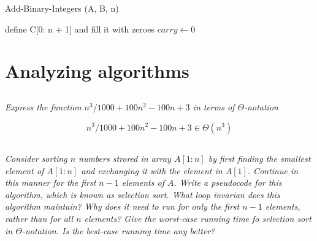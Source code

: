 \documentclass[11pt,oneside,titlepage]{book}
\begin{document}
\begin{function}
  \caption{Add-Binary-Integers (A, B, n)}
  define C[0: n + 1] and fill it with zeroes\;
  $carry \leftarrow 0$\;
  \;

\end{function}

\section{Analyzing algorithms}

\subsection{}

\textit{Express the function $n^3/1000 + 100n^2 - 100n + 3$ in terms of $\Theta$-notation}

$$n^3/1000 + 100n^2 - 100n + 3 \in \Theta(n^3)$$

\subsection{}

\textit{Consider sorting $n$ numbers strored in array $A[1: n]$ by first finding the smallest
  element of $A[1:n]$ and exchanging it with the element in $A[1]$. Continue in this manner for
  the first $n - 1$ elements of $A$. Write a pseudocode for this algorithm, which is known as
  selection sort. What loop invarian does this algorithm maintain? Why does it need to run
  for only the first $n - 1$ elements, rather than for all $n$ elements? Give the worst-case
  running time fo selection sort in $\Theta$-notation. Is the best-case running time
  any better?}
\end{document}
